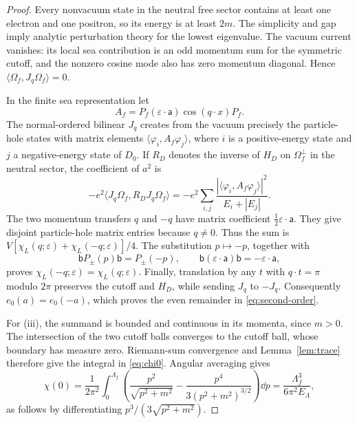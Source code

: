 \begin{proof}
Every nonvacuum state in the neutral free sector contains at least one
electron and one positron, so its energy is at least \(2m\). The simplicity
and gap imply analytic perturbation theory for the lowest eigenvalue.
The vacuum current vanishes: its local sea contribution is an odd momentum
sum for the symmetric cutoff, and the nonzero cosine mode also has zero
momentum diagonal. Hence \(\langle\Omega_f,J_q\Omega_f\rangle=0\).

In the finite sea representation let
\[
 A_f=P_f(\varepsilon\cdot\boldsymbol{\mathsf a})
             \cos(q\cdot x)P_f.
\]
The normal-ordered bilinear \(J_q\) creates from the vacuum precisely the
particle-hole states with matrix elements
\(\langle\varphi_i,A_f\varphi_j\rangle\), where \(i\) is a positive-energy
state and \(j\) a negative-energy state of \(D_0\). If \(R_D\) denotes the
inverse of \(H_D\) on \(\Omega_f^\perp\) in the neutral sector, the
coefficient of \(a^2\) is
\[
 -e^2\langle J_q\Omega_f,R_DJ_q\Omega_f\rangle
 =-e^2\sum_{i,j}
   \frac{|\langle\varphi_i,A_f\varphi_j\rangle|^2}{E_i+|E_j|}.
\]
The two momentum transfers \(q\) and \(-q\) have matrix coefficient
\(\frac12\varepsilon\cdot\boldsymbol{\mathsf a}\). They give disjoint
particle-hole matrix entries because \(q\ne0\). Thus the sum is
\(V[\chi_L(q;\varepsilon)+\chi_L(-q;\varepsilon)]/4\).
The substitution \(p\mapsto-p\), together with
\[
 \mathsf bP_\pm(p)\mathsf b=P_\pm(-p),\qquad
 \mathsf b(\varepsilon\cdot\boldsymbol{\mathsf a})\mathsf b
 =-\varepsilon\cdot\boldsymbol{\mathsf a},
\]
proves \(\chi_L(-q;\varepsilon)=\chi_L(q;\varepsilon)\).
Finally, translation by any \(t\) with \(q\cdot t=\pi\) modulo \(2\pi\)
preserves the cutoff and \(H_D\), while sending \(J_q\) to \(-J_q\).
Consequently \(e_0(a)=e_0(-a)\), which proves the even remainder in
\eqref{eq:second-order}.

For (iii), the summand is bounded and continuous in its momenta, since
\(m>0\). The intersection of the two cutoff balls converges to the cutoff
ball, whose boundary has measure zero. Riemann-sum convergence and
Lemma~\ref{lem:trace} therefore give the integral in \eqref{eq:chi0}.
Angular averaging gives
\[
 \chi(0)=\frac1{2\pi^2}\int_0^{\Lambda_f}
 \left(\frac{p^2}{\sqrt{p^2+m^2}}
       -\frac{p^4}{3(p^2+m^2)^{3/2}}\right)\dd p
 =\frac{\Lambda_f^3}{6\pi^2E_\Lambda},
\]
as follows by differentiating \(p^3/(3\sqrt{p^2+m^2})\).
\end{proof}

